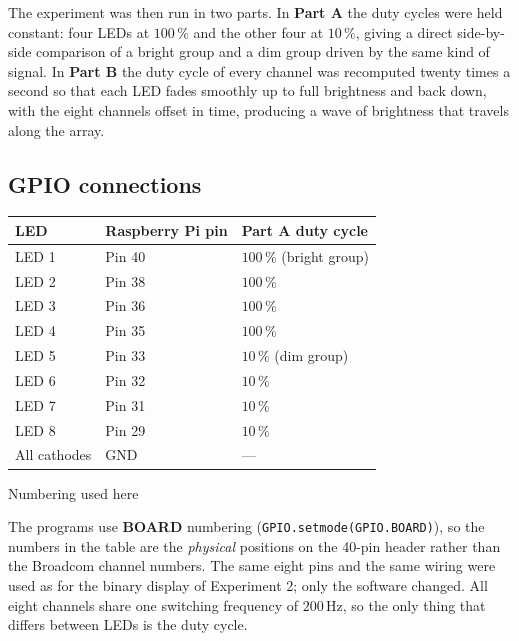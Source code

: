 \documentclass[10pt,a4paper]{article}
\begin{document}
The experiment was then run in two parts. In \textbf{Part A} the duty cycles were held
constant: four LEDs at $100\,\%$ and the other four at $10\,\%$, giving a direct
side-by-side comparison of a bright group and a dim group driven by the same kind of
signal. In \textbf{Part B} the duty cycle of every channel was recomputed twenty times a
second so that each LED fades smoothly up to full brightness and back down, with the
eight channels offset in time, producing a wave of brightness that travels along the
array.

\subsection{GPIO connections}

\vspace{2pt}
\noindent
\begin{minipage}[t]{0.48\textwidth}
\vspace{0pt}
\begin{tabularx}{\linewidth}{@{}l l >{\raggedright\arraybackslash}X@{}}
\toprule
\rowcolor{soft}
\textbf{LED} & \textbf{Raspberry Pi pin} & \textbf{Part A duty cycle} \\
\midrule
LED 1 & Pin 40 & $100\,\%$ (bright group) \\
LED 2 & Pin 38 & $100\,\%$ \\
LED 3 & Pin 36 & $100\,\%$ \\
LED 4 & Pin 35 & $100\,\%$ \\
LED 5 & Pin 33 & $10\,\%$ (dim group) \\
LED 6 & Pin 32 & $10\,\%$ \\
LED 7 & Pin 31 & $10\,\%$ \\
LED 8 & Pin 29 & $10\,\%$ \\
\midrule
All cathodes & GND & --- \\
\bottomrule
\end{tabularx}
\end{minipage}\hfill
\begin{minipage}[t]{0.49\textwidth}
\vspace{0pt}
\begin{titledbox}[unbreakable]{Numbering used here}
\raggedright
The programs use \textbf{BOARD} numbering (\texttt{GPIO.setmode(GPIO.BOARD)}), so the
numbers in the table are the \emph{physical} positions on the 40-pin header rather than
the Broadcom channel numbers. The same eight pins and the same wiring were used as for
the binary display of Experiment 2; only the software changed. All eight channels
share one switching frequency of $200\,\mathrm{Hz}$, so the only thing that differs
between LEDs is the duty cycle.
\end{titledbox}
\end{minipage}
\end{document}

